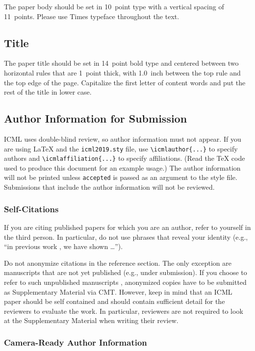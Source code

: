 \documentclass{article}
\begin{document}
The paper body should be set in 10~point type with a vertical spacing
of 11~points. Please use Times typeface throughout the text.

\subsection{Title}

The paper title should be set in 14~point bold type and centered
between two horizontal rules that are 1~point thick, with 1.0~inch
between the top rule and the top edge of the page. Capitalize the
first letter of content words and put the rest of the title in lower
case.

\subsection{Author Information for Submission}
\label{author info}

ICML uses double-blind review, so author information must not appear. If
you are using \LaTeX\/ and the \texttt{icml2019.sty} file, use
\verb+\icmlauthor{...}+ to specify authors and \verb+\icmlaffiliation{...}+ to specify affiliations. (Read the TeX code used to produce this document for an example usage.) The author information
will not be printed unless \texttt{accepted} is passed as an argument to the
style file.
Submissions that include the author information will not
be reviewed.

\subsubsection{Self-Citations}

If you are citing published papers for which you are an author, refer
to yourself in the third person. In particular, do not use phrases
that reveal your identity (e.g., ``in previous work \cite{langley00}, we
have shown \ldots'').

Do not anonymize citations in the reference section. The only exception are manuscripts that are
not yet published (e.g., under submission). If you choose to refer to
such unpublished manuscripts \cite{anonymous}, anonymized copies have
to be submitted
as Supplementary Material via CMT\@. However, keep in mind that an ICML
paper should be self contained and should contain sufficient detail
for the reviewers to evaluate the work. In particular, reviewers are
not required to look at the Supplementary Material when writing their
review.

\subsubsection{Camera-Ready Author Information}
\label{final author}
\end{document}
